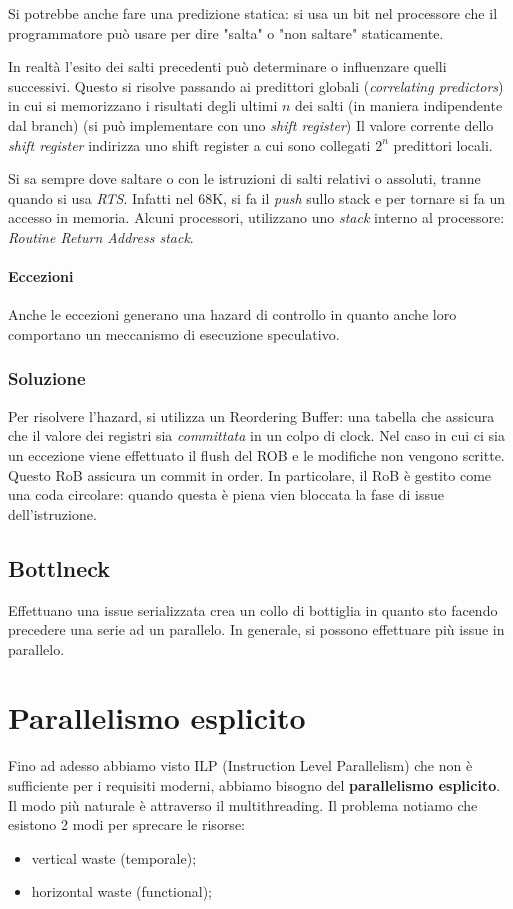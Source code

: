 \documentclass{article}
\begin{document}
Si potrebbe anche fare una predizione statica: si usa un bit nel processore che il programmatore può usare per dire "salta" o "non saltare" staticamente.

In realtà l'esito dei salti precedenti può determinare o influenzare quelli successivi. Questo si risolve passando ai predittori globali (\textit{correlating predictors}) in cui si memorizzano i risultati degli ultimi $n$ dei salti (in maniera indipendente dal branch) (si può implementare con uno \textit{shift register}) Il valore corrente dello \textit{shift register} indirizza uno shift register a cui sono collegati $2^n$ predittori locali.

Si sa sempre dove saltare o con le istruzioni di salti relativi o assoluti, tranne quando si usa \textit{RTS}. Infatti nel 68K, si fa il \textit{push} sullo stack e per tornare si fa un accesso in memoria. Alcuni processori, utilizzano uno \textit{stack} interno al processore: \textit{Routine Return Address stack}.

\paragraph{Eccezioni} Anche le eccezioni generano una hazard di controllo in quanto anche loro comportano un meccanismo di esecuzione speculativo.

\subsubsection{Soluzione}
Per risolvere l'hazard, si utilizza un Reordering Buffer: una tabella che assicura che il valore dei registri sia \textit{committata} in un colpo di clock. Nel caso in cui ci sia un eccezione viene effettuato il flush del ROB e le modifiche non vengono scritte. Questo RoB assicura un commit in order. In particolare, il RoB è gestito come una coda circolare: quando questa è piena vien bloccata la fase di issue dell'istruzione.

\subsection{Bottlneck}
Effettuano una issue serializzata crea un collo di bottiglia in quanto sto facendo precedere una serie ad un parallelo. In generale, si possono effettuare più issue in parallelo. 

\section{Parallelismo esplicito}
Fino ad adesso abbiamo visto ILP (Instruction Level Parallelism) che non è sufficiente per i requisiti moderni, abbiamo bisogno del \textbf{parallelismo esplicito}. Il modo più naturale è attraverso il multithreading. Il problema notiamo che esistono 2 modi per sprecare le risorse:
\begin{itemize}
    \item vertical waste (temporale);
    \item horizontal waste (functional);
\end{itemize}
\end{document}
